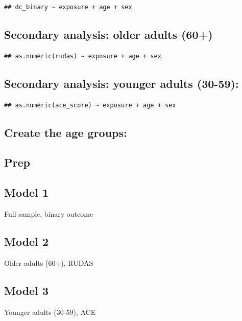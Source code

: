 \documentclass[
  12pt,
]{article}
\begin{document}
\begin{verbatim}
## dc_binary ~ exposure + age + sex
\end{verbatim}

\subsection{Secondary analysis: older adults
(60+)}\label{secondary-analysis-older-adults-60}

\begin{verbatim}
## as.numeric(rudas) ~ exposure + age + sex
\end{verbatim}

\subsection{Secondary analysis: younger adults
(30-59):}\label{secondary-analysis-younger-adults-30-59}

\begin{verbatim}
## as.numeric(ace_score) ~ exposure + age + sex
\end{verbatim}

\subsection{Create the age groups:}\label{create-the-age-groups}

\subsection{Prep}\label{prep}

\subsection{Model 1}\label{model-1}

Full sample, binary outcome

\subsection{Model 2}\label{model-2}

Older adults (60+), RUDAS

\subsection{Model 3}\label{model-3}

Younger adults (30-59), ACE
\end{document}
